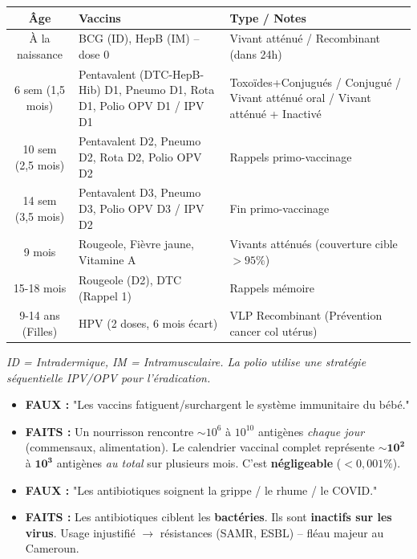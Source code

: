 \documentclass[11pt]{article}
\begin{document}
\begin{exemplebox}
\begin{center}
\begin{tabular}{|c|l|l|}
\hline
\textbf{Âge} & \textbf{Vaccins} & \textbf{Type / Notes} \\
\hline
À la naissance & BCG (ID), HepB (IM) -- dose 0 & Vivant atténué / Recombinant (dans 24h) \\
\hline
6 sem (1,5 mois) & Pentavalent (DTC-HepB-Hib) D1, Pneumo D1, Rota D1, Polio OPV D1 / IPV D1 & Toxoïdes+Conjugués / Conjugué / Vivant atténué oral / Vivant atténué + Inactivé \\
\hline
10 sem (2,5 mois) & Pentavalent D2, Pneumo D2, Rota D2, Polio OPV D2 & Rappels primo-vaccinage \\
\hline
14 sem (3,5 mois) & Pentavalent D3, Pneumo D3, Polio OPV D3 / IPV D2 & Fin primo-vaccinage \\
\hline
9 mois & Rougeole, Fièvre jaune, Vitamine A & Vivants atténués (couverture cible $>95\%$) \\
\hline
15-18 mois & Rougeole (D2), DTC (Rappel 1) & Rappels mémoire \\
\hline
9-14 ans (Filles) & HPV (2 doses, 6 mois écart) & VLP Recombinant (Prévention cancer col utérus) \\
\hline
\end{tabular}
\end{center}
\emph{ID = Intradermique, IM = Intramusculaire. La polio utilise une stratégie séquentielle IPV/OPV pour l'éradication.}
\end{exemplebox}

\begin{attention}
\begin{itemize}
    \item \textbf{FAUX :} "Les vaccins fatiguent/surchargent le système immunitaire du bébé."
    \item \textbf{FAITS :} Un nourrisson rencontre $\sim 10^6$ à $10^{10}$ antigènes \emph{chaque jour} (commensaux, alimentation). Le calendrier vaccinal complet représente $\sim \mathbf{10^2}$ à $\mathbf{10^3}$ antigènes \emph{au total} sur plusieurs mois. C'est \textbf{négligeable} ($<0,001\%$).
    \item \textbf{FAUX :} "Les antibiotiques soignent la grippe / le rhume / le COVID."
    \item \textbf{FAITS :} Les antibiotiques ciblent les \textbf{bactéries}. Ils sont \textbf{inactifs sur les virus}. Usage injustifié $\rightarrow$ résistances (SAMR, ESBL) -- fléau majeur au Cameroun.
\end{itemize}
\end{attention}
\end{document}
